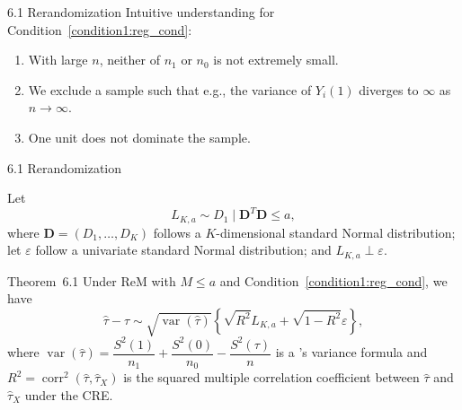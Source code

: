 \documentclass[aspectratio=169, 12pt]{beamer}
\begin{document}
\begin{frame}{6.1 Rerandomization}
  Intuitive understanding for Condition~\ref{condition1:reg_cond}:
  \begin{enumerate}
    \item With large $n$, neither of $n_1$ or $n_0$ is not extremely small.
    \item We exclude a sample such that e.g., the variance of $Y_i(1)$ diverges to $\infty$ as $n\to\infty$.
    \item One unit does not dominate the sample.
  \end{enumerate}
\end{frame}

\begin{frame}{6.1 Rerandomization}
  
  Let 
  \[
  L_{K,a}\sim D_1 \mid \bm{D}^T\bm{D} \leq a,
  \]
  where $\bm{D}=(D_1,\dots,D_K)$ follows a $K$-dimensional standard Normal distribution; let $\varepsilon$ follow a univariate standard Normal distribution; and $L_{K,a}\perp \varepsilon$.  
  \begin{keybox}{Theorem~6.1}
    Under ReM with $M\leq a$ and Condition~\ref{condition1:reg_cond}, we have
    \[
    \widehat{\tau}-\tau \sim \sqrt{\operatorname{var}(\widehat{\tau})}\left\{\sqrt{R^2}L_{K,a}+\sqrt{1-R^2}\varepsilon\right\},
    \]
    where 
    $
    \operatorname{var}(\widehat{\tau}) = \dfrac{S^2(1)}{n_1}+\dfrac{S^2(0)}{n_0} - \dfrac{S^2(\tau)}{n}
    $
    is a \citet{neyman1923application}'s variance formula and $R^2=\operatorname{corr}^2(\widehat{\tau},\widehat{\tau}_X)$ is the squared multiple correlation coefficient between $\widehat{\tau}$ and $\widehat{\tau}_X$ under the CRE. 
  \end{keybox}
\end{frame}
\end{document}
